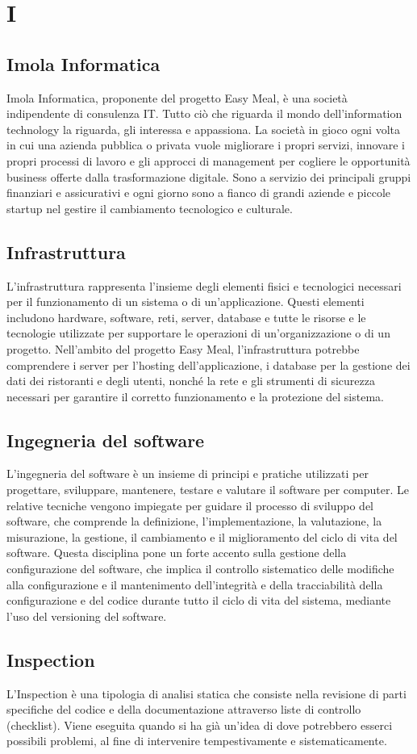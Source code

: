 \section{I} 
\subsection{Imola Informatica} 
Imola Informatica, proponente del progetto Easy Meal, è una società indipendente di consulenza IT. Tutto ciò che riguarda il mondo dell’information technology la riguarda, gli interessa e appassiona. La società in gioco ogni volta in cui una azienda pubblica o privata vuole migliorare i propri servizi, innovare i propri processi di lavoro e gli approcci di management per cogliere le opportunità business offerte dalla trasformazione digitale. Sono a servizio dei principali gruppi finanziari e assicurativi e ogni giorno sono a fianco di grandi aziende e piccole startup nel gestire il cambiamento tecnologico e culturale.
\subsection{Infrastruttura} 
L'infrastruttura rappresenta l'insieme degli elementi fisici e tecnologici necessari per il funzionamento di un sistema o di un'applicazione. Questi elementi includono hardware, software, reti, server, database e tutte le risorse e le tecnologie utilizzate per supportare le operazioni di un'organizzazione o di un progetto. Nell'ambito del progetto Easy Meal, l'infrastruttura potrebbe comprendere i server per l'hosting dell'applicazione, i database per la gestione dei dati dei ristoranti e degli utenti, nonché la rete e gli strumenti di sicurezza necessari per garantire il corretto funzionamento e la protezione del sistema.
\subsection{Ingegneria del software} 
L'ingegneria del software è un insieme di principi e pratiche utilizzati per progettare, sviluppare, mantenere, testare e valutare il software per computer. Le relative tecniche vengono impiegate per guidare il processo di sviluppo del software, che comprende la definizione, l'implementazione, la valutazione, la misurazione, la gestione, il cambiamento e il miglioramento del ciclo di vita del software. Questa disciplina pone un forte accento sulla gestione della configurazione del software, che implica il controllo sistematico delle modifiche alla configurazione e il mantenimento dell'integrità e della tracciabilità della configurazione e del codice durante tutto il ciclo di vita del sistema, mediante l'uso del versioning del software.
\subsection{Inspection} 
L'Inspection è una tipologia di analisi statica che consiste nella revisione di parti specifiche del codice e della documentazione attraverso liste di controllo (checklist). Viene eseguita quando si ha già un’idea di dove potrebbero esserci possibili problemi, al fine di intervenire tempestivamente e sistematicamente.
